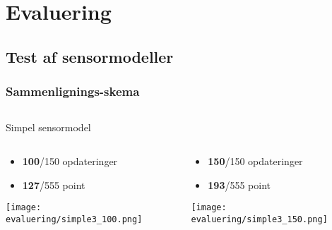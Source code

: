 \section{Evaluering}

\subsection{Test af sensormodeller}
\begin{frame}
\frametitle{Sammenlignings-skema}
\centering
\vspace{-1em}

\vspace{1em}
\begin{columns}
\begin{column}{.49\textwidth}
\end{column}
\begin{column}{.49\textwidth}
\end{column}
\end{columns}
\end{frame}


\begin{frame}[fragile]{Simpel sensormodel}
	\begin{columns}
		\begin{column}{0.5\textwidth}
			\begin{itemize}
			\item \textbf{100}/150 opdateringer
			\item \textbf{127}/555 point
			\end{itemize}
			\texttt{[image: evaluering/simple3\_100.png]}
		\end{column}
		\begin{column}{0.5\textwidth}
			\begin{itemize}
			\item \textbf{150}/150 opdateringer
			\item \textbf{193}/555 point
			\end{itemize}
			\texttt{[image: evaluering/simple3\_150.png]}
		\end{column}
\end{columns}
\end{frame}

